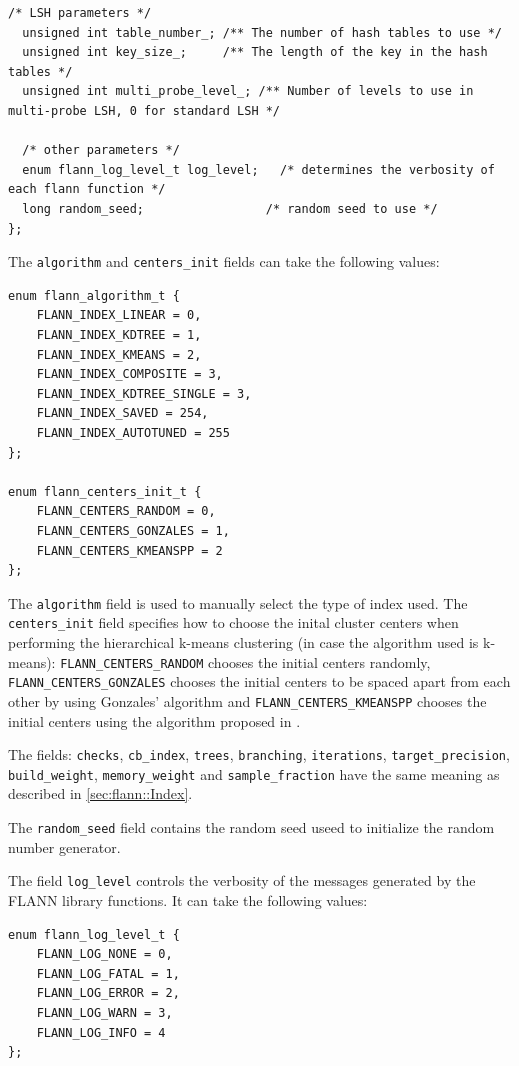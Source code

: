 \documentclass[letter,10pt]{article}
\begin{document}
\begin{description}
\begin{Verbatim}[fontsize=\footnotesize]
  /* LSH parameters */
  unsigned int table_number_; /** The number of hash tables to use */
  unsigned int key_size_;     /** The length of the key in the hash tables */
  unsigned int multi_probe_level_; /** Number of levels to use in multi-probe LSH, 0 for standard LSH */

  /* other parameters */
  enum flann_log_level_t log_level;   /* determines the verbosity of each flann function */
  long random_seed;          		/* random seed to use */
};
\end{Verbatim}

The \texttt{algorithm} and \texttt{centers\_init} fields can take the
following values:
\begin{Verbatim}[fontsize=\footnotesize]
enum flann_algorithm_t {
	FLANN_INDEX_LINEAR = 0,
	FLANN_INDEX_KDTREE = 1,
	FLANN_INDEX_KMEANS = 2,
	FLANN_INDEX_COMPOSITE = 3,
	FLANN_INDEX_KDTREE_SINGLE = 3,
	FLANN_INDEX_SAVED = 254,
	FLANN_INDEX_AUTOTUNED = 255
};

enum flann_centers_init_t {
	FLANN_CENTERS_RANDOM = 0,
	FLANN_CENTERS_GONZALES = 1,
	FLANN_CENTERS_KMEANSPP = 2
};
\end{Verbatim}
The \texttt{algorithm} field is used to manually select the type of index
used. The \texttt{centers\_init} field specifies how to choose the inital
cluster centers when performing the hierarchical k-means clustering (in
case the algorithm used is k-means): \texttt{FLANN\_CENTERS\_RANDOM} chooses the
initial centers randomly, \texttt{FLANN\_CENTERS\_GONZALES} chooses the
initial centers to be spaced apart from each other by using Gonzales' algorithm
and \texttt{FLANN\_CENTERS\_KMEANSPP} chooses the initial centers using the algorithm
proposed in \cite{arthur_kmeanspp_2007}.

The fields: \texttt{checks}, \texttt{cb\_index}, \texttt{trees}, \texttt{branching},  
\texttt{iterations}, \texttt{target\_precision}, \texttt{build\_weight},
 \texttt{memory\_weight} and \texttt{sample\_fraction} have the
same meaning as described in \ref{sec:flann::Index}.

The \texttt{random\_seed} field contains the random seed useed to initialize the random
number generator. 

The field \texttt{log\_level} controls the verbosity of the messages generated by the FLANN
library functions. It can take the following values:
\begin{Verbatim}[fontsize=\footnotesize]
enum flann_log_level_t {
    FLANN_LOG_NONE = 0,
    FLANN_LOG_FATAL = 1,
    FLANN_LOG_ERROR = 2,
    FLANN_LOG_WARN = 3,
    FLANN_LOG_INFO = 4
};
\end{Verbatim}
\end{description}
\end{document}
